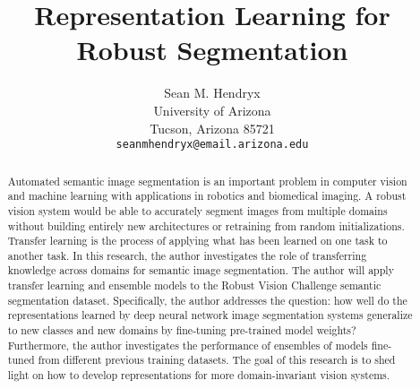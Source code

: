 \documentclass[10pt,twocolumn,letterpaper]{article}
\begin{document}
\title{Representation Learning for Robust Segmentation}

\author{Sean M. Hendryx\\
University of Arizona\\
Tucson, Arizona 85721\\
{\tt\small seanmhendryx@email.arizona.edu}
}

\maketitle

\doublespacing

\begin{abstract}
  Automated semantic image segmentation is an important problem in computer vision and
  machine learning with applications in robotics and biomedical imaging. A robust vision
  system would be able to accurately segment images from multiple domains without building entirely new
  architectures or retraining from random initializations. Transfer learning is the process of applying what has
  been learned on one task to another task. In this research, the author investigates the role of transferring
  knowledge across domains for semantic image segmentation. The author will apply transfer learning and ensemble models
  to the Robust Vision Challenge semantic segmentation dataset.
  Specifically, the author addresses the question: how well do the representations learned by deep neural network image segmentation systems
  generalize to new classes and new domains by fine-tuning pre-trained model weights? Furthermore, the author
  investigates the performance of ensembles of models fine-tuned from different previous training datasets.
  The goal of this research is to shed light on how to develop representations for more domain-invariant vision systems.

\end{abstract}
\end{document}
